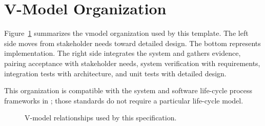\section{V-Model Organization}
Figure~\ref{Figure:VModel} summarizes the \gls{vmodel} organization used by
this template. The left side moves from stakeholder needs toward detailed
design. The bottom represents implementation. The right side integrates the
system and gathers evidence, pairing acceptance with stakeholder needs, system
verification with requirements, integration tests with architecture, and unit
tests with detailed design.

This organization is compatible with the system and software life-cycle
process frameworks in \cite{ISO15288,ISO12207}; those standards do not require
a particular life-cycle model.

\begin{figure}[htbp]
\centering

\caption{V-model relationships used by this specification.}
\label{Figure:VModel}
\end{figure}
